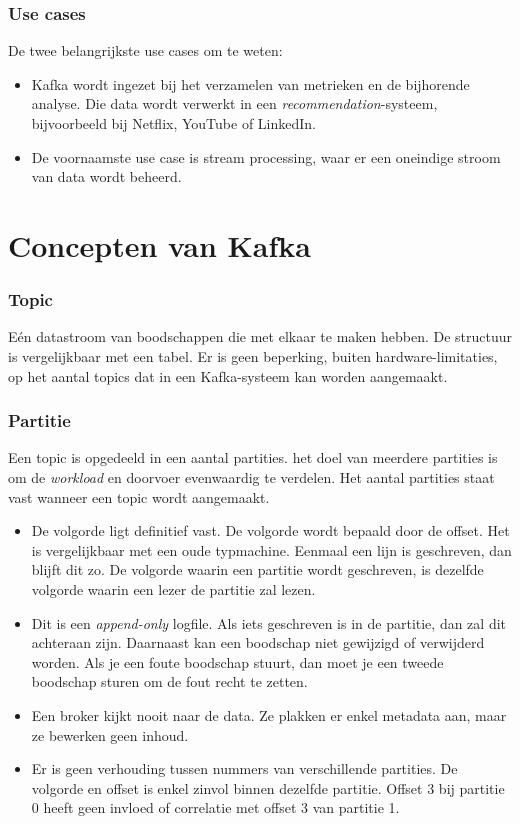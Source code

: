 \documentclass[a4paper,10pt,twoside]{report}
\begin{document}
\subsubsection{Use cases}

De twee belangrijkste use cases om te weten:

\begin{itemize}
	\item Kafka wordt ingezet bij het verzamelen van metrieken en de bijhorende analyse. Die data wordt verwerkt in een \textit{recommendation}-systeem, bijvoorbeeld bij Netflix, YouTube of LinkedIn.
	\item De voornaamste use case is stream processing, waar er een oneindige stroom van data wordt beheerd.
\end{itemize}


\section{Concepten van Kafka}

\subsubsection{Topic}

Eén datastroom van boodschappen die met elkaar te maken hebben. De structuur is vergelijkbaar met een tabel. Er is geen beperking, buiten hardware-limitaties, op het aantal topics dat in een Kafka-systeem kan worden aangemaakt.

\subsubsection{Partitie}

Een topic is opgedeeld in een aantal partities. het doel van meerdere partities is om de \textit{workload} en doorvoer evenwaardig te verdelen. Het aantal partities staat vast wanneer een topic wordt aangemaakt.

\begin{itemize}
	\item De volgorde ligt definitief vast. De volgorde wordt bepaald door de offset. Het is vergelijkbaar met een oude typmachine. Eenmaal een lijn is geschreven, dan blijft dit zo. De volgorde waarin een partitie wordt geschreven, is dezelfde volgorde waarin een lezer de partitie zal lezen.
	\item Dit is een \textit{append-only} logfile. Als iets geschreven is in de partitie, dan zal dit achteraan zijn. Daarnaast kan een boodschap niet gewijzigd of verwijderd worden. Als je een foute boodschap stuurt, dan moet je een tweede boodschap sturen om de fout recht te zetten.
	\item Een broker kijkt nooit naar de data. Ze plakken er enkel metadata aan, maar ze bewerken geen inhoud.
	\item Er is geen verhouding tussen nummers van verschillende partities. De volgorde en offset is enkel zinvol binnen dezelfde partitie. Offset 3 bij partitie 0 heeft geen invloed of correlatie met offset 3 van partitie 1.
\end{itemize}
\end{document}
